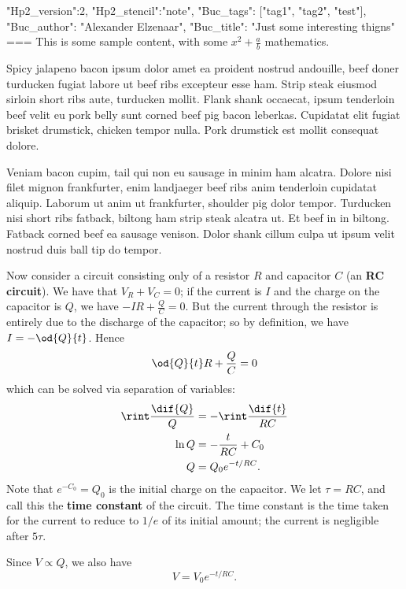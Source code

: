 {"Hp2_version":2, "Hp2_stencil":"note",
 "Buc_tags": ["tag1", "tag2", "test"],
 "Buc_author": "Alexander Elzenaar",
 "Buc_title": "Just some interesting thigns"}
===
This is some sample content, with some $ x^2 + \frac{a}{b} $ mathematics.

Spicy jalapeno bacon ipsum dolor amet ea proident nostrud andouille, beef doner turducken fugiat labore ut beef ribs excepteur esse ham. Strip steak eiusmod sirloin short ribs aute, turducken mollit. Flank shank occaecat, ipsum tenderloin beef velit eu pork belly sunt corned beef pig bacon leberkas. Cupidatat elit fugiat brisket drumstick, chicken tempor nulla. Pork drumstick est mollit consequat dolore.

Veniam bacon cupim, tail qui non eu sausage in minim ham alcatra. Dolore nisi filet mignon frankfurter, enim landjaeger beef ribs anim tenderloin cupidatat aliquip. Laborum ut anim ut frankfurter, shoulder pig dolor tempor. Turducken nisi short ribs fatback, biltong ham strip steak alcatra ut. Et beef in in biltong. Fatback corned beef ea sausage venison. Dolor shank cillum culpa ut ipsum velit nostrud duis ball tip do tempor.

Now consider a circuit consisting only of a resistor $ R $ and capacitor $ C $ (an \textbf{RC circuit}). We have that $ V_R + V_C = 0 $;
if the current is $ I $ and the charge on the capacitor is $ Q $, we have $ -IR + \frac{Q}{C} = 0 $.
But the current through the resistor is entirely due to the discharge of the capacitor; so by definition,
we have $ I = -\od{Q}{t} $. Hence
\begin{displaymath}
  \od{Q}{t} R + \frac{Q}{C} = 0
\end{displaymath}
which can be solved via separation of variables:
\begin{align}
  \rint \frac{\dif{Q}}{Q} &= -\rint \frac{\dif{t}}{RC}\nonumber\\
  \ln Q &= -\frac{t}{RC} + C_0\nonumber\\
  Q &= Q_0 e^{-t/RC}.
\end{align}
Note that $ e^{-C_0} = Q_0 $ is the initial charge on the capacitor. We let $ \tau = RC $, and call this the
\textbf{time constant} of the circuit. The time constant is the time taken for the current to reduce to $ 1/e $
of its initial amount; the current is negligible after $ 5\tau $.

Since $ V \propto Q $, we also have
\begin{equation}
  V = V_0 e^{-t/RC}.
\end{equation}

